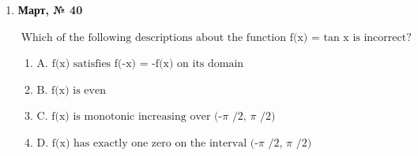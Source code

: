 \begin{enumerate}
\begin{enumerate}
\item $\displaystyle \text{C. 0 < a < 1}$
\item $\displaystyle \text{D. a > 0}$
\end{enumerate}
\item \textbf{Март, № 40} \par \smallskip
$\displaystyle \text{Which of the following descriptions about the function f(x) = }\tan\text{ x is incorrect?}$
\begin{enumerate}
\item $\displaystyle \text{A. f(x) satisfies f(-x) = -f(x) on its domain}$
\item $\displaystyle \text{B. f(x) is even}$
\item $\displaystyle \text{C. f(x) is monotonic increasing over (-}\pi\text{ /2, }\pi\text{ /2)}$
\item $\displaystyle \text{D. f(x) has exactly one zero on the interval (-}\pi\text{ /2, }\pi\text{ /2)}$
\end{enumerate}
\end{enumerate}

